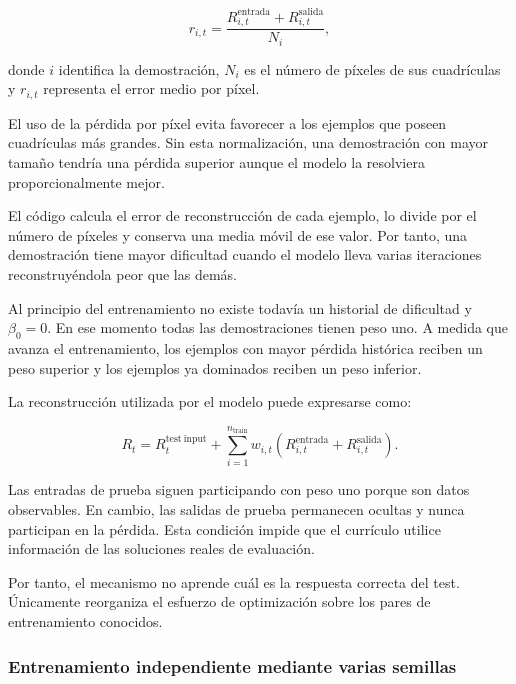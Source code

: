 \documentclass[11pt,a4paper,spanish]{book}
\numberwithin{equation}{chapter}
\numberwithin{figure}{chapter}
\begin{document}
\begin{equation}
r_{i,t}
=
\frac{
R^{\mathrm{entrada}}_{i,t}
+
R^{\mathrm{salida}}_{i,t}
}{
N_i
},
\label{eq:eje-b-demo-loss}
\end{equation}

donde \(i\) identifica la demostración, \(N_i\) es el número de píxeles de sus
cuadrículas y \(r_{i,t}\) representa el error medio por píxel.

El uso de la pérdida por píxel evita favorecer a los ejemplos que poseen cuadrículas más grandes. Sin esta normalización, una demostración con mayor tamaño 
tendría una pérdida superior aunque el modelo la resolviera proporcionalmente mejor.

El código calcula el error de reconstrucción de cada ejemplo, lo divide por el número de píxeles y conserva una media móvil de ese valor.
Por tanto, una demostración tiene mayor dificultad cuando el modelo lleva varias iteraciones reconstruyéndola peor que las demás.

Al principio del entrenamiento no existe todavía un historial de dificultad y \(\beta_0=0\). En ese momento todas las demostraciones tienen peso uno. A
medida que avanza el entrenamiento, los ejemplos con mayor pérdida histórica reciben un peso superior y los ejemplos ya dominados reciben un peso inferior.

La reconstrucción utilizada por el modelo puede expresarse como:

\begin{equation}
R_t =
R^{\mathrm{test\ input}}_t
+
\sum_{i=1}^{n_{\mathrm{train}}}
w_{i,t}
\left(
R^{\mathrm{entrada}}_{i,t}
+
R^{\mathrm{salida}}_{i,t}
\right).
\label{eq:eje-b-reconstruction}
\end{equation}

Las entradas de prueba siguen participando con peso uno porque son datos observables. En cambio, las salidas de prueba permanecen ocultas y nunca
participan en la pérdida. Esta condición impide que el currículo utilice información de las soluciones reales de evaluación.

Por tanto, el mecanismo no aprende cuál es la respuesta correcta del test. Únicamente reorganiza el esfuerzo de optimización sobre los pares de
entrenamiento conocidos.

\subsubsection{Entrenamiento independiente mediante varias semillas}
\end{document}
